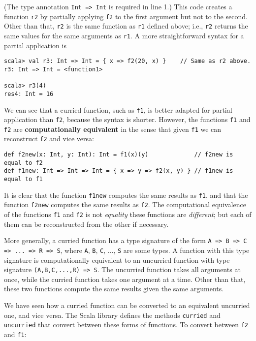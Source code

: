 \noindent (The type annotation \lstinline!Int => Int! is required
in line 1.) This code creates a function \lstinline!r2! by partially
applying \lstinline!f2! to the first argument but not to the second.
Other than that, \lstinline!r2! is the same function as \lstinline!r1!
defined above; i.e., \lstinline!r2! returns the same values for the
same arguments as \lstinline!r1!. A more straightforward syntax for
a partial application is
\begin{lstlisting}
scala> val r3: Int => Int = { x => f2(20, x) }    // Same as r2 above.
r3: Int => Int = <function1>

scala> r3(4)
res4: Int = 16
\end{lstlisting}

We can see that a curried function, such as \lstinline!f1!, is better
adapted for partial application than \lstinline!f2!, because the
syntax is shorter. However, the functions \lstinline!f1! and \lstinline!f2!
are \textbf{computationally equivalent}
in the sense that given \lstinline!f1! we can reconstruct \lstinline!f2!
and vice versa:
\begin{lstlisting}
def f2new(x: Int, y: Int): Int = f1(x)(y)             // f2new is equal to f2
def f1new: Int => Int => Int = { x => y => f2(x, y) } // f1new is equal to f1
\end{lstlisting}
It is clear that the function \lstinline!f1new! computes the same
results as \lstinline!f1!, and that the function \lstinline!f2new!
computes the same results as \lstinline!f2!. The computational equivalence
of the functions \lstinline!f1! and \lstinline!f2! is not \emph{equality}
 \textemdash{} these functions are \emph{different}; but each of them
can be reconstructed from the other if necessary. 

More generally, a curried function has a type signature of the form
\lstinline!A => B => C => ... => R => S!, where \lstinline!A!, \lstinline!B!,
\lstinline!C!, ..., \lstinline!S! are some types. A function with
this type signature is computationally equivalent to an uncurried
function with type signature \lstinline!(A,B,C,...,R) => S!. The
uncurried function takes all arguments at once, while the curried
function takes one argument at a time. Other than that, these two
functions compute the same results given the same arguments.

We have seen how a curried function can be converted to an equivalent
uncurried one, and vice versa. The Scala library defines the methods
\lstinline!curried! and \lstinline!uncurried! that convert between
these forms of functions. To convert between \lstinline!f2! and \lstinline!f1!:

